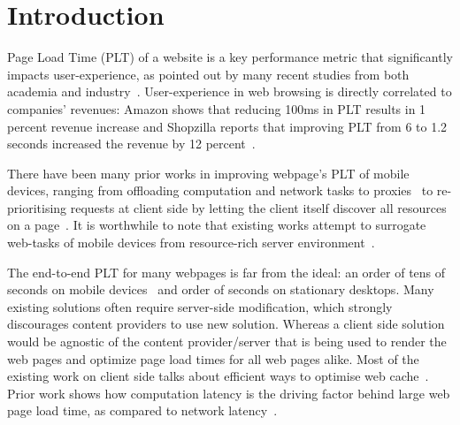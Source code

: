 \section{Introduction}
\label{sec:intro}

Page Load Time (PLT) of a website is a key performance metric that
significantly impacts user-experience, as pointed out by many recent studies
from both academia and industry~\cite{bhatti2000integrating, bouch2000quality}.
User-experience in web browsing is directly correlated to companies' revenues:
Amazon shows that reducing 100ms in PLT results in 1 percent revenue increase
and Shopzilla reports that improving PLT from 6 to 1.2 seconds increased the
revenue by 12 percent~\cite{url3}. 

There have been many prior works in improving webpage's PLT of mobile devices,
ranging from offloading computation and network tasks to
proxies~\cite{netravali2015mahimahi, sivakumar2014parcel, wang2014speedy} to
re-prioritising requests at client side by letting the client itself discover
all resources on a page~\cite{butkiewicz2015klotski, netravali2016polaris}.  It
is worthwhile to note that existing works attempt to surrogate web-tasks of
mobile devices from resource-rich server
environment~\cite{ruamviboonsuk2017vroom}.
 
The end-to-end PLT for many webpages is far from the ideal: an order
of tens of seconds on mobile devices~\cite{wang2013demystifying} and
order of seconds on stationary desktops.  Many existing solutions
often require server-side modification, which strongly discourages
content providers to use new solution. 
Whereas a client side solution would be agnostic of the content
provider/server that is being used to render the web pages and
optimize page load times for all web pages alike. 
Most of the existing work on client side talks about efficient ways to
optimise web cache~\cite{wang2014much}.  
Prior work shows how computation latency is the driving factor behind
large web page load time, as compared to network
latency~\cite{vesuna2016caching}.

